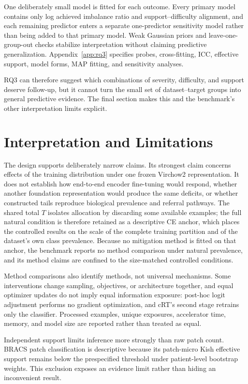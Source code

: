 \documentclass[11pt]{article}
\begin{document}
One deliberately small model is fitted for each outcome. Every primary model contains only log achieved imbalance ratio and support--difficulty alignment, and each remaining predictor enters a separate one-predictor sensitivity model rather than being added to that primary model. Weak Gaussian priors and leave-one-group-out checks stabilize interpretation without claiming predictive generalization. Appendix~\ref{app:rq3} specifies probes, cross-fitting, ICC, effective support, model forms, MAP fitting, and sensitivity analyses.

RQ3 can therefore suggest which combinations of severity, difficulty, and support deserve follow-up, but it cannot turn the small set of dataset--target groups into general predictive evidence. The final section makes this and the benchmark's other interpretation limits explicit.

\section{Interpretation and Limitations}
\label{sec:limits}
The design supports deliberately narrow claims. Its strongest claim concerns effects of the training distribution under one frozen Virchow2 representation. It does not establish how end-to-end encoder fine-tuning would respond, whether another foundation representation would produce the same deficits, or whether constructed tails reproduce biological prevalence and referral pathways. The shared total $T$ isolates allocation by discarding some available examples; the full natural condition is therefore retained as a descriptive CE anchor, which places the controlled results on the scale of the complete training partition and of the dataset's own class prevalence. Because no mitigation method is fitted on that anchor, the benchmark reports no method comparison under natural prevalence, and its method claims are confined to the size-matched controlled conditions.

Method comparisons also identify methods, not universal mechanisms. Some interventions change sampling, objectives, or architecture together, and equal optimizer updates do not imply equal information exposure: post-hoc logit adjustment performs no gradient optimization, and cRT's second stage retrains only the classifier. Processed examples, unique exposures, accelerator time, memory, and model size are reported rather than treated as equal.

Independent support limits inference more strongly than raw patch count. BRACS patch classification is descriptive because its patch-micro Kish effective support remains below the prespecified threshold under patient-level bootstrap weights. This exclusion exposes an evidence limit rather than hiding an inconvenient result.
\end{document}
